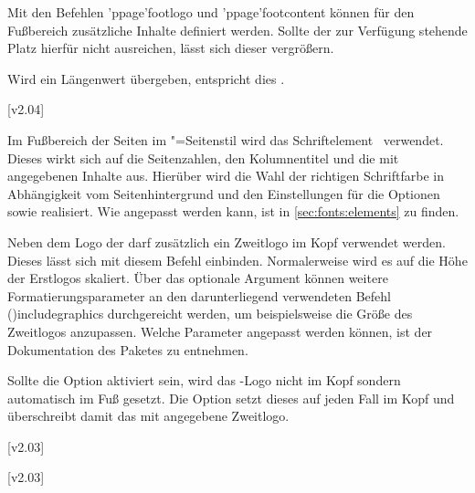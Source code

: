 \begin{DeclareEntity*}{}
\begin{DeclareEntity*}{}
\begin{DeclareEntity*}{}
\begin{Declaration}
Mit den Befehlen \Macro'ppage'{footlogo} und \Macro'ppage'{footcontent} können 
für den Fußbereich zusätzliche Inhalte definiert werden. Sollte der zur 
Verfügung stehende Platz hierfür nicht ausreichen, lässt sich dieser vergrößern.
%
\begin{DeclareValues}{}
  Wird ein Längenwert übergeben, entspricht dies 
  .
\end{DeclareValues}
\end{Declaration}

\begin{Declaration}
  {}
  [v2.04]

Im Fußbereich der Seiten im "=Seitenstil wird das 
Schriftelement~ verwendet. Dieses wirkt sich auf die 
Seitenzahlen, den Kolumnentitel und die mit  angegebenen 
Inhalte aus. Hierüber wird die Wahl der richtigen Schriftfarbe in Abhängigkeit 
vom Seitenhintergrund und den Einstellungen für die Optionen  
sowie  realisiert. Wie  angepasst werden 
kann, ist in \autoref{sec:fonts:elements} zu finden.
\end{Declaration}

\begin{Declaration}
  {}

Neben dem Logo der \TnUD darf zusätzlich ein Zweitlogo im Kopf verwendet 
werden. Dieses lässt sich mit diesem Befehl einbinden. Normalerweise wird es 
auf die Höhe der Erstlogos skaliert. Über das optionale Argument können weitere 
Formatierungsparameter an den darunterliegend verwendeten Befehl 
\Macro(){includegraphics} durchgereicht werden, um 
beispielsweise die Größe des Zweitlogos anzupassen. Welche Parameter angepasst 
werden können, ist der Dokumentation des Paketes  zu 
entnehmen.

Sollte die Option  aktiviert sein, wird das \DDC-Logo nicht im Kopf 
sondern automatisch im Fuß gesetzt. Die Option  setzt dieses 
auf jeden Fall im Kopf und überschreibt damit das mit  
angegebene Zweitlogo.
\end{Declaration}

\begin{Declaration}
  {}
  [v2.03]
\begin{Declaration}
  {}
  [v2.03]


\end{Declaration}
\end{Declaration}
\end{DeclareEntity*}
\end{DeclareEntity*}
\end{DeclareEntity*}
